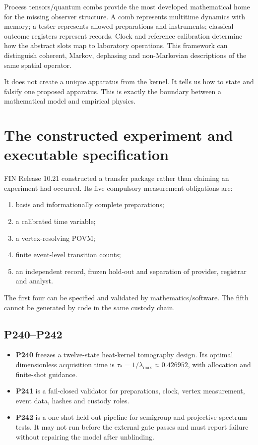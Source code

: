 \documentclass[11pt,a4paper]{article}
\theoremstyle{definition}
\theoremstyle{remark}
\begin{document}
Process tensors/quantum combs provide the most developed mathematical home for the missing observer structure. A comb represents multitime dynamics with memory; a tester represents allowed preparations and instruments; classical outcome registers represent records. Clock and reference calibration determine how the abstract slots map to laboratory operations. This framework can distinguish coherent, Markov, dephasing and non-Markovian descriptions of the same spatial operator.

It does not create a unique apparatus from the kernel. It tells us how to state and falsify one proposed apparatus. This is exactly the boundary between a mathematical model and empirical physics.

\section{The constructed experiment and executable specification}

FIN Release 10.21 constructed a transfer package rather than claiming an experiment had occurred. Its five compulsory measurement obligations are:

\begin{enumerate}
\item basis and informationally complete preparations;
\item a calibrated time variable;
\item a vertex-resolving POVM;
\item finite event-level transition counts;
\item an independent record, frozen hold-out and separation of provider, registrar and analyst.
\end{enumerate}

The first four can be specified and validated by mathematics/software. The fifth cannot be generated by code in the same custody chain.

\subsection{P240--P242}

\begin{itemize}
\item \textbf{P240} freezes a twelve-state heat-kernel tomography design. Its optimal dimensionless acquisition time is $\tau_*=1/\lambda_{\max}\approx0.426952$, with allocation and finite-shot guidance.
\item \textbf{P241} is a fail-closed validator for preparations, clock, vertex measurement, event data, hashes and custody roles.
\item \textbf{P242} is a one-shot held-out pipeline for semigroup and projective-spectrum tests. It may not run before the external gate passes and must report failure without repairing the model after unblinding.
\end{itemize}
\end{document}
